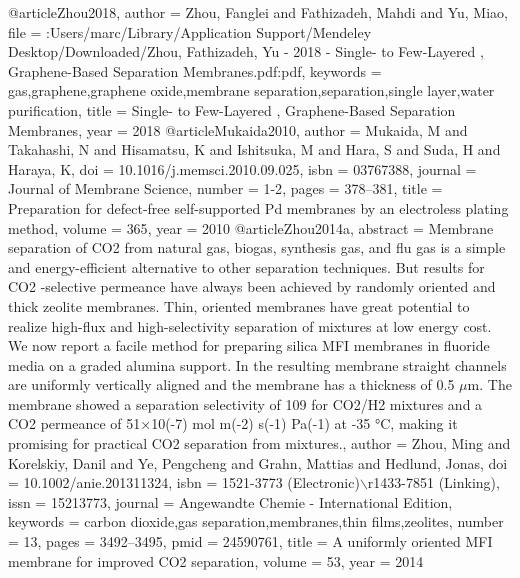 @article{Zhou2018,
author = {Zhou, Fanglei and Fathizadeh, Mahdi and Yu, Miao},
file = {:Users/marc/Library/Application Support/Mendeley Desktop/Downloaded/Zhou, Fathizadeh, Yu - 2018 - Single- to Few-Layered , Graphene-Based Separation Membranes.pdf:pdf},
keywords = {gas,graphene,graphene oxide,membrane separation,separation,single layer,water purification},
title = {{Single- to Few-Layered , Graphene-Based Separation Membranes}},
year = {2018}
}
@article{Mukaida2010,
author = {Mukaida, M and Takahashi, N and Hisamatsu, K and Ishitsuka, M and Hara, S and Suda, H and Haraya, K},
doi = {10.1016/j.memsci.2010.09.025},
isbn = {03767388},
journal = {Journal of Membrane Science},
number = {1-2},
pages = {378--381},
title = {{Preparation for defect-free self-supported Pd membranes by an electroless plating method}},
volume = {365},
year = {2010}
}
@article{Zhou2014a,
abstract = {Membrane separation of CO2 from natural gas, biogas, synthesis gas, and flu gas is a simple and energy-efficient alternative to other separation techniques. But results for CO2 -selective permeance have always been achieved by randomly oriented and thick zeolite membranes. Thin, oriented membranes have great potential to realize high-flux and high-selectivity separation of mixtures at low energy cost. We now report a facile method for preparing silica MFI membranes in fluoride media on a graded alumina support. In the resulting membrane straight channels are uniformly vertically aligned and the membrane has a thickness of 0.5 $\mu$m. The membrane showed a separation selectivity of 109 for CO2/H2 mixtures and a CO2 permeance of 51×10(-7) mol m(-2) s(-1) Pa(-1) at -35 °C, making it promising for practical CO2 separation from mixtures.},
author = {Zhou, Ming and Korelskiy, Danil and Ye, Pengcheng and Grahn, Mattias and Hedlund, Jonas},
doi = {10.1002/anie.201311324},
isbn = {1521-3773 (Electronic)$\backslash$r1433-7851 (Linking)},
issn = {15213773},
journal = {Angewandte Chemie - International Edition},
keywords = {carbon dioxide,gas separation,membranes,thin films,zeolites},
number = {13},
pages = {3492--3495},
pmid = {24590761},
title = {{A uniformly oriented MFI membrane for improved CO2 separation}},
volume = {53},
year = {2014}
}


